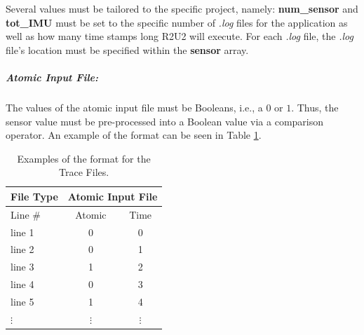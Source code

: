 Several values must be tailored to the specific project, namely: \textbf{num\_sensor} and \textbf{tot\_IMU} must be set to the specific number of \textit{.log} files for the application as well as how many time stamps long R2U2 will execute. For each \textit{.log} file, the \textit{.log} file's location must be specified within the \textbf{sensor} array.

\subparagraph{Atomic Input File:}
\label{Cpp_InputFile}
The values of the atomic input file must be Booleans, i.e., a $0$ or $1$. Thus, the sensor value must be pre-processed into a Boolean value via a comparison operator. An example of the format can be seen in Table \ref{CppTraceTable}.

\begin{table}[H]
	\caption{Examples of the format for the Trace Files.
	\label{CppTraceTable}}
	\begin{center}
	\begin{tabular}{l | cc}
		\hline
		\hline
		\textbf{File Type} & \multicolumn{2}{c}{\textbf{Atomic Input File}}\\
		\hline
		Line \# & Atomic & Time\\
		\hline
		line 1 & 0 & 0\\
		line 2 & 0 & 1\\
		line 3 & 1 & 2\\
		line 4 & 0 & 3\\
		line 5 & 1 & 4\\
		$\vdots$ & $\vdots$ & $\vdots$\\
		\hline
		\hline
	\end{tabular}
	\end{center}
\end{table}

